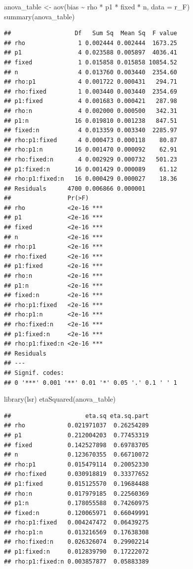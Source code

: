 \documentclass[
]{book}
\newenvironment{Shaded}{\begin{snugshade}}{\end{snugshade}}
\newcommand{\AttributeTok}[1]{\textcolor[rgb]{0.77,0.63,0.00}{#1}}
\newcommand{\FunctionTok}[1]{\textcolor[rgb]{0.00,0.00,0.00}{#1}}
\newcommand{\NormalTok}[1]{#1}
\newcommand{\OtherTok}[1]{\textcolor[rgb]{0.56,0.35,0.01}{#1}}
\newcommand{\SpecialCharTok}[1]{\textcolor[rgb]{0.00,0.00,0.00}{#1}}
\begin{document}
\begin{Shaded}
\begin{Highlighting}[]
\NormalTok{anova\_table }\OtherTok{\textless{}{-}} \FunctionTok{aov}\NormalTok{(bias }\SpecialCharTok{\textasciitilde{}}\NormalTok{ rho }\SpecialCharTok{*}\NormalTok{ p1 }\SpecialCharTok{*}\NormalTok{ fixed }\SpecialCharTok{*}\NormalTok{ n, }\AttributeTok{data =}\NormalTok{ r\_F)}
\FunctionTok{summary}\NormalTok{(anova\_table)}
\end{Highlighting}
\end{Shaded}

\begin{verbatim}
##                  Df   Sum Sq  Mean Sq  F value
## rho               1 0.002444 0.002444  1673.25
## p1                4 0.023588 0.005897  4036.41
## fixed             1 0.015858 0.015858 10854.52
## n                 4 0.013760 0.003440  2354.60
## rho:p1            4 0.001722 0.000431   294.71
## rho:fixed         1 0.003440 0.003440  2354.69
## p1:fixed          4 0.001683 0.000421   287.98
## rho:n             4 0.002000 0.000500   342.31
## p1:n             16 0.019810 0.001238   847.51
## fixed:n           4 0.013359 0.003340  2285.97
## rho:p1:fixed      4 0.000473 0.000118    80.87
## rho:p1:n         16 0.001470 0.000092    62.91
## rho:fixed:n       4 0.002929 0.000732   501.23
## p1:fixed:n       16 0.001429 0.000089    61.12
## rho:p1:fixed:n   16 0.000429 0.000027    18.36
## Residuals      4700 0.006866 0.000001         
##                Pr(>F)    
## rho            <2e-16 ***
## p1             <2e-16 ***
## fixed          <2e-16 ***
## n              <2e-16 ***
## rho:p1         <2e-16 ***
## rho:fixed      <2e-16 ***
## p1:fixed       <2e-16 ***
## rho:n          <2e-16 ***
## p1:n           <2e-16 ***
## fixed:n        <2e-16 ***
## rho:p1:fixed   <2e-16 ***
## rho:p1:n       <2e-16 ***
## rho:fixed:n    <2e-16 ***
## p1:fixed:n     <2e-16 ***
## rho:p1:fixed:n <2e-16 ***
## Residuals                
## ---
## Signif. codes:  
## 0 '***' 0.001 '**' 0.01 '*' 0.05 '.' 0.1 ' ' 1
\end{verbatim}

\begin{Shaded}
\begin{Highlighting}[]
\FunctionTok{library}\NormalTok{(lsr)}
\FunctionTok{etaSquared}\NormalTok{(anova\_table)}
\end{Highlighting}
\end{Shaded}

\begin{verbatim}
##                     eta.sq eta.sq.part
## rho            0.021971037  0.26254289
## p1             0.212004203  0.77453319
## fixed          0.142527898  0.69783705
## n              0.123670355  0.66710072
## rho:p1         0.015479114  0.20052330
## rho:fixed      0.030918819  0.33377652
## p1:fixed       0.015125570  0.19684488
## rho:n          0.017979185  0.22560369
## p1:n           0.178055588  0.74260975
## fixed:n        0.120065971  0.66049991
## rho:p1:fixed   0.004247472  0.06439275
## rho:p1:n       0.013216569  0.17638308
## rho:fixed:n    0.026326074  0.29902214
## p1:fixed:n     0.012839790  0.17222072
## rho:p1:fixed:n 0.003857877  0.05883389
\end{verbatim}
\end{document}
